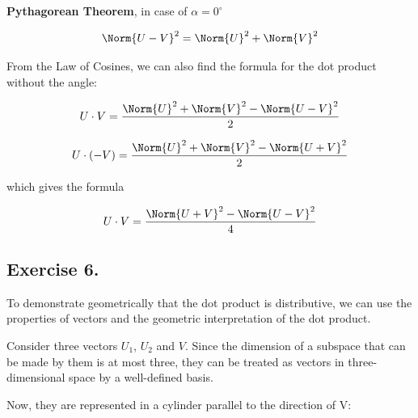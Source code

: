 \documentclass[../main.tex]{subfiles}
\begin{document}
\textbf{Pythagorean Theorem}, in case of $\alpha=0^{\circ}$

\begin{center}
    \begin{equation}
        \Norm{U-V}^2=\Norm{U}^2+\Norm{V}^2
    \end{equation}
\end{center}

From the Law of Cosines, we can also find the formula for the dot product without the angle:

$$
U\cdot V=\frac{\Norm{U}^2+\Norm{V}^2-\Norm{U-V}^2}{2}
$$

$$
U\cdot (-V)=\frac{\Norm{U}^2+\Norm{V}^2-\Norm{U+V}^2}{2}
$$

which gives the formula

\begin{center}
    \begin{equation}
        U\cdot V=\frac{\Norm{U+V}^2-\Norm{U-V}^2}{4}
    \end{equation}
\end{center}

\subsection{Exercise 6.}
To demonstrate geometrically that the dot product is distributive, we can use the properties of vectors and the geometric interpretation of the dot product.

\sol

Consider three vectors $U_1$, $U_2$ and $V$. Since the dimension of a subspace that can be made by them is at most three, they can be treated as vectors in three-dimensional space by a well-defined basis. 

Now, they are represented in a cylinder parallel to the direction of V:
\end{document}

